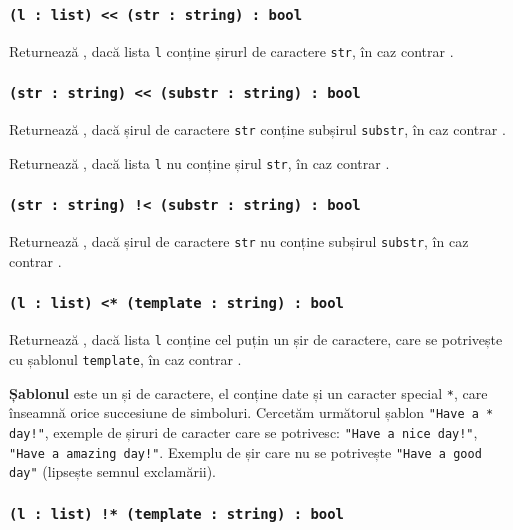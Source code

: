 \subsubsection{\texttt{(l : list) << (str : string) : bool}}

Returnează \true{}, dacă lista \texttt{l} conține șirurl de caractere \texttt{str}, în caz contrar \false{}.

\subsubsection{\texttt{(str : string) << (substr : string) : bool}}

Returnează \true{}, dacă șirul de caractere \texttt{str} conține subșirul \texttt{substr}, în caz contrar \false{}.

Returnează \true{}, dacă lista \texttt{l} nu conține șirul \texttt{str}, în caz contrar \false{}.

\subsubsection{\texttt{(str : string) !< (substr : string) : bool}}

Returnează \true{}, dacă șirul de caractere \texttt{str} nu conține subșirul \texttt{substr}, în caz contrar \false{}.

\subsubsection{\texttt{(l : list) <* (template : string) : bool}}

Returnează \true{}, dacă lista \texttt{l} conține cel puțin un șir de caractere, care se potrivește cu șablonul \texttt{template}, în caz contrar \false{}.

{\bf Șablonul} este un și de caractere, el conține date și un caracter special \texttt{*}, care înseamnă orice succesiune de simboluri. Cercetăm următorul șablon \texttt{"Have a * day!"}, exemple de șiruri de caracter care se potrivesc: \texttt{"Have a nice day!"}, \texttt{"Have a amazing day!"}. Exemplu de șir care nu se potrivește \texttt{"Have a good day"} (lipsește semnul exclamării).

\subsubsection{\texttt{(l : list) !* (template : string) : bool}}

